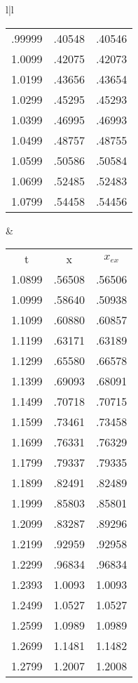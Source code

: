 \begin{figure}
\begin{tabular}{l|l}
\begin{tabular}{ccc}
            .99999 & .40548 & .40546 \\  
            1.0099 & .42075 & .42073 \\  
            1.0199 & .43656 & .43654 \\  
            1.0299 & .45295 & .45293 \\  
            1.0399 & .46995 & .46993 \\  
            1.0499 & .48757 & .48755 \\  
            1.0599 & .50586 & .50584 \\  
            1.0699 & .52485 & .52483 \\  
            1.0799 & .54458 & .54456 \\ 
        \end{tabular}
        &
        \begin{tabular}{ccc}
            \multicolumn{1}{c}{t} &  \multicolumn{1}{c}{x}  & \multicolumn{1}{c}{$x_{ex}$}\\
            1.0899 & .56508 & .56506 \\
            1.0999 & .58640 & .50938 \\
            1.1099 & .60880 & .60857 \\
            1.1199 & .63171 & .63189 \\
            1.1299 & .65580 & .66578 \\
            1.1399 & .69093 & .68091 \\
            1.1499 & .70718 & .70715 \\
            1.1599 & .73461 & .73458 \\
            1.1699 & .76331 & .76329 \\
            1.1799 & .79337 & .79335 \\
            1.1899 & .82491 & .82489 \\
            1.1999 & .85803 & .85801 \\
            1.2099 & .83287 & .89296 \\
            1.2199 & .92959 & .92958 \\
            1.2299 & .96834 & .96834 \\
            1.2393 & 1.0093 & 1.0093 \\
            1.2499 & 1.0527 & 1.0527 \\
            1.2599 & 1.0989 & 1.0989 \\
            1.2699 & 1.1481 & 1.1482 \\
            1.2799 & 1.2007 & 1.2008 \\

\end{tabular}
\end{tabular}
\end{figure}
